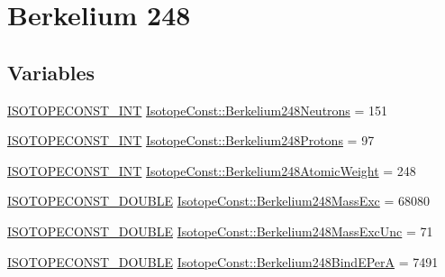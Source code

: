 \hypertarget{group___isotope_const-_berkelium-_bk248}{}\section{Berkelium 248}
\label{group___isotope_const-_berkelium-_bk248}
\subsection*{Variables}
\begin{DoxyCompactItemize}
\item 
\mbox{\hyperlink{group___isotope_const-_macros_ga5f18360b3e99483a35c32d789e62621c}{I\+S\+O\+T\+O\+P\+E\+C\+O\+N\+S\+T\+\_\+\+I\+NT}} \mbox{\hyperlink{group___isotope_const-_berkelium-_bk248_gaf697a3518c9178b1662059bb59ffe5e9}{Isotope\+Const\+::\+Berkelium248\+Neutrons}} = 151
\item 
\mbox{\hyperlink{group___isotope_const-_macros_ga5f18360b3e99483a35c32d789e62621c}{I\+S\+O\+T\+O\+P\+E\+C\+O\+N\+S\+T\+\_\+\+I\+NT}} \mbox{\hyperlink{group___isotope_const-_berkelium-_bk248_gabd9f3c2f28e0f9512594183680e61d1d}{Isotope\+Const\+::\+Berkelium248\+Protons}} = 97
\item 
\mbox{\hyperlink{group___isotope_const-_macros_ga5f18360b3e99483a35c32d789e62621c}{I\+S\+O\+T\+O\+P\+E\+C\+O\+N\+S\+T\+\_\+\+I\+NT}} \mbox{\hyperlink{group___isotope_const-_berkelium-_bk248_ga512382a1b4c209a40fc9493a104e4b00}{Isotope\+Const\+::\+Berkelium248\+Atomic\+Weight}} = 248
\item 
\mbox{\hyperlink{group___isotope_const-_macros_ga8f45a7272ce02c0b4c65c44636ed719a}{I\+S\+O\+T\+O\+P\+E\+C\+O\+N\+S\+T\+\_\+\+D\+O\+U\+B\+LE}} \mbox{\hyperlink{group___isotope_const-_berkelium-_bk248_ga1eae90bd26003ea7814aeb9dd666ee2f}{Isotope\+Const\+::\+Berkelium248\+Mass\+Exc}} = 68080
\item 
\mbox{\hyperlink{group___isotope_const-_macros_ga8f45a7272ce02c0b4c65c44636ed719a}{I\+S\+O\+T\+O\+P\+E\+C\+O\+N\+S\+T\+\_\+\+D\+O\+U\+B\+LE}} \mbox{\hyperlink{group___isotope_const-_berkelium-_bk248_gab643220f83f139904b78b324a3b8f12c}{Isotope\+Const\+::\+Berkelium248\+Mass\+Exc\+Unc}} = 71
\item 
\mbox{\hyperlink{group___isotope_const-_macros_ga8f45a7272ce02c0b4c65c44636ed719a}{I\+S\+O\+T\+O\+P\+E\+C\+O\+N\+S\+T\+\_\+\+D\+O\+U\+B\+LE}} \mbox{\hyperlink{group___isotope_const-_berkelium-_bk248_ga22f85abac58832eb76c212fbf82770db}{Isotope\+Const\+::\+Berkelium248\+Bind\+E\+PerA}} = 7491
\item 

\end{DoxyCompactItemize}

